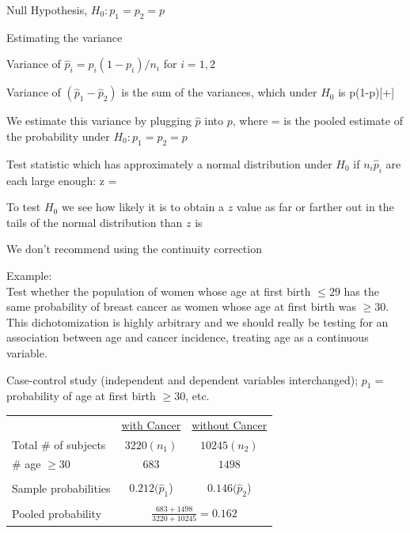 \item Null Hypothesis, $H_{0}: p_{1}=p_{2}=p$
\item Estimating the variance
\bi 
 \item Variance of $\hat{p}_{i} = p_{i}(1-p_{i})/n_{i}$ for $i = 1, 2$
 \item Variance of $\left(\hat{p}_1 - \hat{p}_2\right)$ is the sum of the
  variances, which under $H_{0}$ is
   \beq
    p(1-p)[+]
   \eeq
 \item We estimate this variance by plugging $\hat{p}$ into $p$, where
 \beq
  = 
 \eeq
 is the pooled estimate of the probability under $H_{0}: p_1 = p_2 = p$
\ei
\item Test statistic which has approximately a normal distribution
  under $H_{0}$ if $n_{i}\hat{p}_{i}$ are each large enough:
\beq
z = 
\eeq
\item To test $H_{0}$ we see how likely it is to obtain a $z$ value as
  far or farther out in the tails of the normal distribution than $z$
  is
\item We don't recommend using the continuity correction
\item Example:  \\
Test whether the population of women whose age at first birth $\leq
29$ has the same probability of breast cancer as women whose age at
first birth was $\geq 30$.  This dichotomization is highly arbitrary
and we should really be testing for an association between age and
cancer incidence, treating age as a continuous variable.
\item Case-control study (independent and dependent variables
  interchanged); $p_{1}=$ probability of age at first birth $\geq 30$,
  etc.

\begin{tabular}{lcc} 
 & \underline{with Cancer} & \underline{without Cancer} \\
Total \# of subjects & $3220 (n_1)$ & $10245 (n_2)$ \\
\# age $\geq 30$ & $683$ & $1498$ \\ \\
Sample probabilities & $0.212 (\hat{p}_1$) & $0.146 (\hat{p}_2$) \\ \\
Pooled probability &\multicolumn{2}{c}{$\frac{683 + 1498}{3220 + 10245} = 0.162$} \\
\end{tabular}


